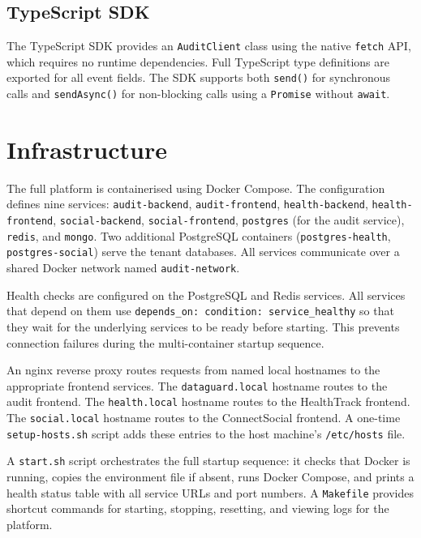 \documentclass[a4paper,12pt,onecolumn]{report}
\begin{document}
\subsection{TypeScript SDK}

The TypeScript SDK provides an \texttt{AuditClient} class using the native \texttt{fetch} API, which requires no runtime dependencies.
Full TypeScript type definitions are exported for all event fields.
The SDK supports both \texttt{send()} for synchronous calls and \texttt{sendAsync()} for non-blocking calls using a \texttt{Promise} without \texttt{await}.

\section{Infrastructure}

The full platform is containerised using Docker Compose.
The configuration defines nine services: \texttt{audit-backend}, \texttt{audit-frontend}, \texttt{health-backend}, \texttt{health-frontend}, \texttt{social-backend}, \texttt{social-frontend}, \texttt{postgres} (for the audit service), \texttt{redis}, and \texttt{mongo}.
Two additional PostgreSQL containers (\texttt{postgres-health}, \texttt{postgres-social}) serve the tenant databases.
All services communicate over a shared Docker network named \texttt{audit-network}.

Health checks are configured on the PostgreSQL and Redis services.
All services that depend on them use \texttt{depends\_on: condition: service\_healthy} so that they wait for the underlying services to be ready before starting.
This prevents connection failures during the multi-container startup sequence.

An nginx reverse proxy routes requests from named local hostnames to the appropriate frontend services.
The \texttt{dataguard.local} hostname routes to the audit frontend.
The \texttt{health.local} hostname routes to the HealthTrack frontend.
The \texttt{social.local} hostname routes to the ConnectSocial frontend.
A one-time \texttt{setup-hosts.sh} script adds these entries to the host machine's \texttt{/etc/hosts} file.

A \texttt{start.sh} script orchestrates the full startup sequence: it checks that Docker is running, copies the environment file if absent, runs Docker Compose, and prints a health status table with all service URLs and port numbers.
A \texttt{Makefile} provides shortcut commands for starting, stopping, resetting, and viewing logs for the platform.
\end{document}
